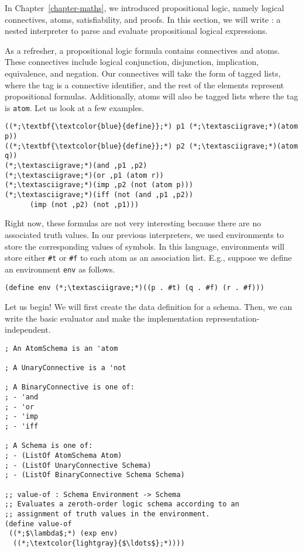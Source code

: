 In Chapter~\ref{chapter-maths}, we introduced propositional logic, namely logical connectives, atoms, satisfiability, and proofs. In this section, we will write : a nested interpreter to parse and evaluate propositional logical expressions.

As a refresher, a propositional logic formula contains connectives and atoms. These connectives include logical conjunction, disjunction, implication, equivalence, and negation. Our connectives will take the form of tagged lists, where the tag is a connective identifier, and the rest of the elements represent propositional formulas. Additionally, atoms will also be tagged lists where the tag is \texttt{atom}. Let us look at a few examples.

\begin{cl}[]{}\begin{lstlisting}[language=MySOutput]
((*;\textbf{\textcolor{blue}{define}};*) p1 (*;\textasciigrave;*)(atom p))
((*;\textbf{\textcolor{blue}{define}};*) p2 (*;\textasciigrave;*)(atom q))
(*;\textasciigrave;*)(and ,p1 ,p2)
(*;\textasciigrave;*)(or ,p1 (atom r))
(*;\textasciigrave;*)(imp ,p2 (not (atom p)))
(*;\textasciigrave;*)(iff (not (and ,p1 ,p2)) 
      (imp (not ,p2) (not ,p1)))
\end{lstlisting}\end{cl}

Right now, these formulas are not very interesting because there are no associated truth values. In our previous interpreters, we used environments to store the corresponding values of symbols. In this language, environments will store either \texttt{\#t} or \texttt{\#f} to each atom as an association list. E.g., suppose we define an environment \texttt{env} as follows.

\begin{cl}[]{}\begin{lstlisting}[language=MyScheme]
(define env (*;\textasciigrave;*)((p . #t) (q . #f) (r . #f)))
\end{lstlisting}\end{cl}

Let us begin! We will first create the data definition for a schema. Then, we can write the basic evaluator and make the implementation representation-independent. 

\begin{cl}[]{}\begin{lstlisting}[language=MyScheme]
; An AtomSchema is an 'atom

; A UnaryConnective is a 'not

; A BinaryConnective is one of:
; - 'and
; - 'or
; - 'imp
; - 'iff

; A Schema is one of:
; - (ListOf AtomSchema Atom)
; - (ListOf UnaryConnective Schema)
; - (ListOf BinaryConnective Schema Schema)

;; value-of : Schema Environment -> Schema
;; Evaluates a zeroth-order logic schema according to an
;; assignment of truth values in the environment.
(define value-of
 ((*;$\lambda$;*) (exp env)
  ((*;\textcolor{lightgray}{$\ldots$};*))))
\end{lstlisting}\end{cl}

